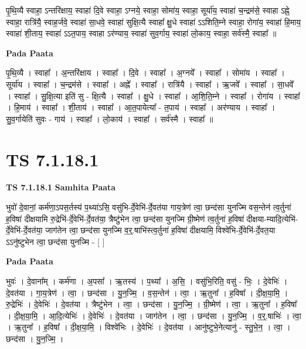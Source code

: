 \documentclass[17pt]{extarticle}
\begin{document}
पृ॒थि॒व्यै स्वाहा॒ ऽन्तरि॑क्षाय॒ स्वाहा॑ दि॒वे स्वाहा॒ ऽग्नये॒ स्वाहा॒ सोमा॑य॒ स्वाहा॒ सूर्या॑य॒ स्वाहा॑ च॒न्द्रम॑से॒ स्वाहा ऽह्ने॒ स्वाहा॒ रात्रि॑यै॒ स्वाह॒र्जवे॒ स्वाहा॑ सा॒धवे॒ स्वाहा॑ सुक्षि॒त्यै स्वाहा᳚ क्षु॒धे स्वाहा॑ ऽऽशिति॒म्ने स्वाहा॒ रोगा॑य॒ स्वाहा॑ हि॒माय॒ स्वाहा॑ शी॒ताय॒ स्वाहा॑ ऽऽत॒पाय॒ स्वाहा ऽर॑ण्याय॒ स्वाहा॑ सुव॒र्गाय॒ स्वाहा॑ लो॒काय॒ स्वाहा॒ सर्व॑स्मै॒ स्वाहा᳚ ॥ \newline

\textbf{Pada Paata} \newline

पृ॒थि॒व्यै । स्वाहा᳚ । अ॒न्तरि॑क्षाय । स्वाहा᳚ । दि॒वे । स्वाहा᳚ । अ॒ग्नये᳚ । स्वाहा᳚ । सोमा॑य । स्वाहा᳚ । सूर्या॑य । स्वाहा᳚ । च॒न्द्रम॑से । स्वाहा᳚ । अह्ने᳚ । स्वाहा᳚ । रात्रि॑यै । स्वाहा᳚ । ऋ॒जवे᳚ । स्वाहा᳚ । सा॒धवे᳚ । स्वाहा᳚ । सु॒क्षि॒त्या इति॑ सु - क्षि॒त्यै । स्वाहा᳚ । क्षु॒धे । स्वाहा᳚ । आ॒शि॒ति॒म्ने । स्वाहा᳚ । रोगा॑य । स्वाहा᳚ । हि॒माय॑ । स्वाहा᳚ । शी॒ताय॑ । स्वाहा᳚ । आ॒त॒पायेत्या᳚ - त॒पाय॑ । स्वाहा᳚ । अर॑ण्याय । स्वाहा᳚ । सु॒व॒र्गायेति॑ सुवः - गाय॑ । स्वाहा᳚ । लो॒काय॑ । स्वाहा᳚ । सर्व॑स्मै । स्वाहा᳚ ॥  \newline




\section*{ TS 7.1.18.1 }

\textbf{TS 7.1.18.1 } \newline
\textbf{Samhita Paata} \newline

भुवो॑ दे॒वानां॒ कर्म॑णा॒ऽपस॒र्तस्य॑ प॒थ्या॑ऽसि॒ वसु॑भि-र्दे॒वेभि॑-र्दे॒वत॑या गाय॒त्रेण॑ त्वा॒ छन्द॑सा युनज्मि वस॒न्तेन॑ त्व॒र्तुना॑ ह॒विषा॑ दीक्षयामि रु॒द्रेभि॑-र्दे॒वेभि॑-र्दे॒वत॑या॒ त्रैष्टु॑भेन त्वा॒ छन्द॑सा युनज्मि ग्री॒ष्मेण॑ त्व॒र्तुना॑ ह॒विषा॑ दीक्षया-म्यादि॒त्येभि॑-र्दे॒वेभि॑-र्दे॒वत॑या॒ जाग॑तेन त्वा॒ छन्द॑सा युनज्मि व॒र्॒.षाभि॑स्त्व॒र्तुना॑ ह॒विषा॑ दीक्षयामि॒ विश्वे॑भि-र्दे॒वेभि॑-र्दे॒वत॒या ऽऽनु॑ष्टुभेन त्वा॒ छन्द॑सा युनज्मि - [  ] \newline

\textbf{Pada Paata} \newline

भुवः॑ । दे॒वाना᳚म् । कर्म॑णा । अ॒पसा᳚ । ऋ॒तस्य॑ । प॒थ्या᳚ । अ॒सि॒ । वसु॑भि॒रिति॒ वसु॑ - भिः॒ । दे॒वेभिः॑ । दे॒वत॑या । गा॒य॒त्रेण॑ । त्वा॒ । छन्द॑सा । यु॒न॒ज्मि॒ । व॒स॒न्तेन॑ । त्वा॒ । ऋ॒तुना᳚ । ह॒विषा᳚ । दी॒क्ष॒या॒मि॒ । रु॒द्रेभिः॑ । दे॒वेभिः॑ । दे॒वत॑या । त्रैष्टु॑भेन । त्वा॒ । छन्द॑सा । यु॒न॒ज्मि॒ । ग्री॒ष्मेण॑ । त्वा॒ । ऋ॒तुना᳚ । ह॒विषा᳚ । दी॒क्ष॒या॒मि॒ । आ॒दि॒त्येभिः॑ । दे॒वेभिः॑ । दे॒वत॑या । जाग॑तेन । त्वा॒ । छन्द॑सा । यु॒न॒ज्मि॒ । व॒र्॒.षाभिः॑ । त्वा॒ । ऋ॒तुना᳚ । ह॒विषा᳚ । दी॒क्ष॒या॒मि॒ । विश्वे॑भिः । दे॒वेभिः॑ । दे॒वत॑या । आनु॑ष्टुभे॒नेत्यानु॑ - स्तु॒भे॒न॒ । त्वा॒ । छन्द॑सा । यु॒न॒ज्मि॒ ।  \newline
\end{document}
